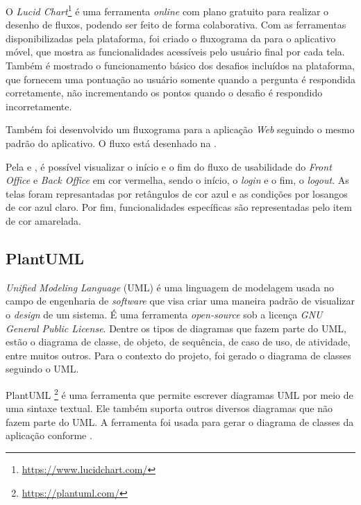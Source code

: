 O \textit{Lucid Chart}\footnote{\url{https://www.lucidchart.com/}} é uma ferramenta \textit{online} com plano gratuito para realizar o desenho de fluxos, podendo ser feito de forma colaborativa. Com as ferramentas disponibilizadas pela plataforma, foi criado o fluxograma da  para o aplicativo móvel, que mostra as funcionalidades acessíveis pelo usuário final por cada tela. Também é mostrado o funcionamento básico dos desafios incluídos na plataforma, que fornecem uma pontuação ao usuário somente quando a pergunta é respondida corretamente, não incrementando os pontos quando o desafio é respondido incorretamente.


Também foi desenvolvido um fluxograma para a aplicação \textit{Web} seguindo o mesmo padrão do aplicativo. O fluxo está desenhado na .


Pela  e , é possível visualizar o início e o fim do fluxo de usabilidade do \textit{Front Office} e \textit{Back Office} em cor vermelha, sendo o início, o \textit{login} e o fim, o \textit{logout}. As telas foram represantadas por retângulos de cor azul e as condições por losangos de cor azul claro. Por fim, funcionalidades específicas são representadas pelo item de cor amarelada.

\subsection{PlantUML}
\label{plantuml}

\textit{Unified Modeling Language} (UML) \cite{uml} é uma linguagem de modelagem usada no campo de engenharia de \textit{software} que visa criar uma maneira padrão de visualizar o \textit{design} de um sistema.  É uma ferramenta \textit{open-source} sob a licença \textit{GNU General Public License}. Dentre os tipos de diagramas que fazem parte do UML, estão o diagrama de classe, de objeto, de sequência, de caso de uso, de atividade, entre muitos outros. Para o contexto do projeto, foi gerado o diagrama de classes seguindo o UML.

PlantUML \footnote{\url{https://plantuml.com/}} é uma ferramenta que permite escrever diagramas UML por meio de uma sintaxe textual. Ele também suporta outros diversos diagramas que não fazem parte do UML. A ferramenta foi usada para gerar o diagrama de classes da aplicação conforme .

